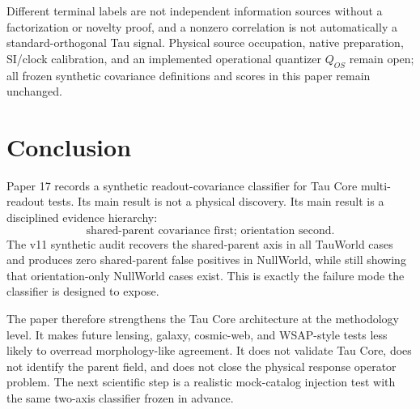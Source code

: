 \documentclass[12pt]{article}
\begin{document}
Different terminal labels are not independent information sources without a
factorization or novelty proof, and a nonzero correlation is not automatically
a standard-orthogonal Tau signal. Physical source occupation, native
preparation, SI/clock calibration, and an implemented operational quantizer
$Q_{OS}$ remain open; all frozen synthetic covariance definitions and scores in
this paper remain unchanged.

\section{Conclusion}

Paper 17 records a synthetic readout-covariance classifier for Tau Core
multi-readout tests.  Its main result is not a physical discovery.  Its main
result is a disciplined evidence hierarchy:
\[
  \boxed{
  \text{shared-parent covariance first; orientation second.}
  }
\]
The v11 synthetic audit recovers the shared-parent axis in all TauWorld cases
and produces zero shared-parent false positives in NullWorld, while still
showing that orientation-only NullWorld cases exist.  This is exactly the
failure mode the classifier is designed to expose.

The paper therefore strengthens the Tau Core architecture at the methodology
level.  It makes future lensing, galaxy, cosmic-web, and WSAP-style tests less
likely to overread morphology-like agreement.  It does not validate Tau Core,
does not identify the parent field, and does not close the physical response
operator problem.  The next scientific step is a realistic mock-catalog
injection test with the same two-axis classifier frozen in advance.




\end{document}
